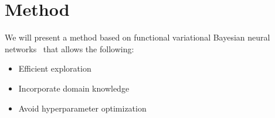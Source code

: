 \documentclass[]{uai2021} %
\newcommand{\R}{\mathbb{R}}
\newcommand{\E}{\mathbb{E}}
\newcommand{\N}{\mathbb{N}}
\newcommand{\X}{\mathbf{X}}
\newcommand{\f}{\mathbf{f}}
\newcommand{\state}{\mathcal{S}}
\newcommand{\action}{\mathcal{A}}
\newcommand{\KL}{\mathrm{KL}}
\begin{document}





\section{Method}
We will present a method based on functional variational Bayesian neural
networks~\citep{sun_functional_2019} that allows the following:

\begin{itemize}
    \item Efficient exploration
    \item Incorporate domain knowledge
    \item Avoid hyperparameter optimization
\end{itemize}
\end{document}

